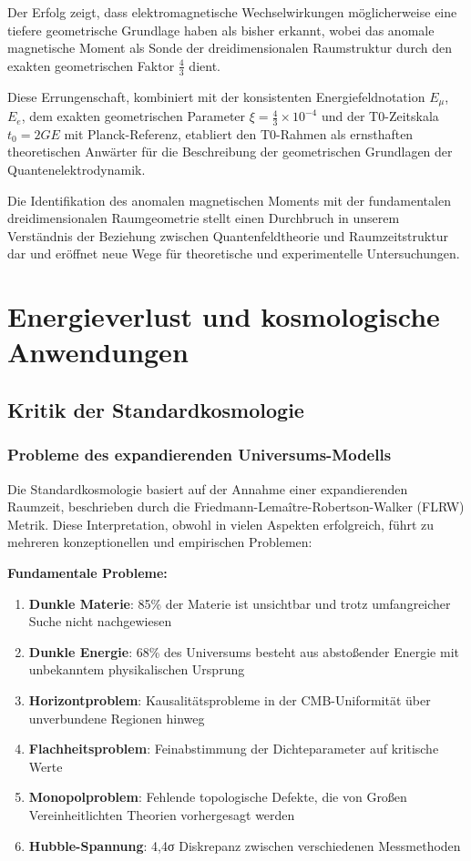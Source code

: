 \documentclass[12pt,a4paper]{report}
\newcommand{\tzero}{t_0}                  %
\begin{document}
	Der Erfolg zeigt, dass elektromagnetische Wechselwirkungen möglicherweise eine tiefere geometrische Grundlage haben als bisher erkannt, wobei das anomale magnetische Moment als Sonde der dreidimensionalen Raumstruktur durch den exakten geometrischen Faktor $\frac{4}{3}$ dient.
	
	Diese Errungenschaft, kombiniert mit der konsistenten Energiefeldnotation $E_\mu$, $E_e$, dem exakten geometrischen Parameter $\xi = \frac{4}{3} \times 10^{-4}$ und der T0-Zeitskala $\tzero = 2GE$ mit Planck-Referenz, etabliert den T0-Rahmen als ernsthaften theoretischen Anwärter für die Beschreibung der geometrischen Grundlagen der Quantenelektrodynamik.
	
	Die Identifikation des anomalen magnetischen Moments mit der fundamentalen dreidimensionalen Raumgeometrie stellt einen Durchbruch in unserem Verständnis der Beziehung zwischen Quantenfeldtheorie und Raumzeitstruktur dar und eröffnet neue Wege für theoretische und experimentelle Untersuchungen.
	\chapter{Energieverlust und kosmologische Anwendungen}
	\label{chap:cosmology}
	
	\section{Kritik der Standardkosmologie}
	\label{sec:critique_standard_cosmology}
	
	\subsection{Probleme des expandierenden Universums-Modells}
	\label{subsec:problems_space_expansion}
	
	Die Standardkosmologie basiert auf der Annahme einer expandierenden Raumzeit, beschrieben durch die Friedmann-Lemaître-Robertson-Walker (FLRW) Metrik. Diese Interpretation, obwohl in vielen Aspekten erfolgreich, führt zu mehreren konzeptionellen und empirischen Problemen:
	
	\textbf{Fundamentale Probleme:}
	\begin{enumerate}
		\item \textbf{Dunkle Materie}: 85\% der Materie ist unsichtbar und trotz umfangreicher Suche nicht nachgewiesen
		\item \textbf{Dunkle Energie}: 68\% des Universums besteht aus abstoßender Energie mit unbekanntem physikalischen Ursprung
		\item \textbf{Horizontproblem}: Kausalitätsprobleme in der CMB-Uniformität über unverbundene Regionen hinweg
		\item \textbf{Flachheitsproblem}: Feinabstimmung der Dichteparameter auf kritische Werte
		\item \textbf{Monopolproblem}: Fehlende topologische Defekte, die von Großen Vereinheitlichten Theorien vorhergesagt werden
		\item \textbf{Hubble-Spannung}: 4,4σ Diskrepanz zwischen verschiedenen Messmethoden
	\end{enumerate}
	
\end{document}
